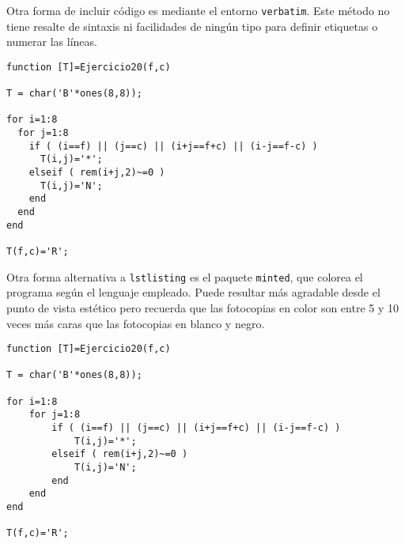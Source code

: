\noindent Otra forma de incluir código es mediante el entorno \texttt{verbatim}.  Este método no tiene resalte de sintaxis ni facilidades de ningún tipo para definir etiquetas o numerar las líneas. 

\begin{verbatim}
function [T]=Ejercicio20(f,c)

T = char('B'*ones(8,8));

for i=1:8
  for j=1:8
    if ( (i==f) || (j==c) || (i+j==f+c) || (i-j==f-c) )
      T(i,j)='*';
    elseif ( rem(i+j,2)~=0 )
      T(i,j)='N';
    end
  end
end

T(f,c)='R';
\end{verbatim}

\noindent Otra forma alternativa a \texttt{lstlisting} es el paquete \texttt{minted}, que colorea el programa según el lenguaje empleado.  Puede resultar más agradable desde el punto de vista estético pero recuerda que las fotocopias en color son entre 5 y 10 veces más caras que las fotocopias en blanco y negro.

\begin{verbatim}
function [T]=Ejercicio20(f,c)

T = char('B'*ones(8,8));

for i=1:8
    for j=1:8
        if ( (i==f) || (j==c) || (i+j==f+c) || (i-j==f-c) )
            T(i,j)='*';
        elseif ( rem(i+j,2)~=0 )
            T(i,j)='N';
        end
    end
end

T(f,c)='R';
\end{verbatim}
